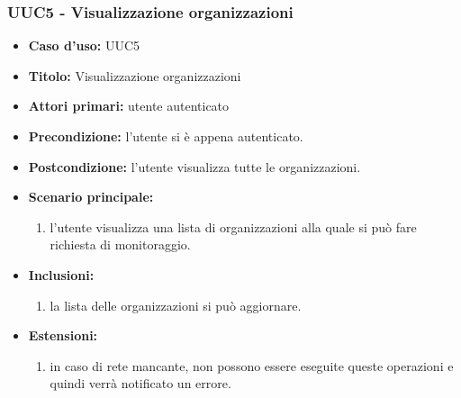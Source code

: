 \documentclass[casi-duso]{subfiles}
\begin{document}
\subsubsection{UUC5 - Visualizzazione organizzazioni}
\label{subsub:UUC5utente}
\begin{itemize}
  \item \textbf{Caso d’uso:} UUC5 
  \item \textbf{Titolo:} Visualizzazione organizzazioni
  \item \textbf{Attori primari:} utente autenticato
  \item \textbf{Precondizione:} l'utente si è appena autenticato.
  \item \textbf{Postcondizione:} l'utente visualizza tutte le organizzazioni.
  \item \textbf{Scenario principale:} 
  \begin{enumerate}
    \item l'utente visualizza una lista di organizzazioni alla quale si può fare richiesta di monitoraggio.
  \end{enumerate}  
  \item \textbf{Inclusioni:} 
  \begin{enumerate}
    \item la lista delle organizzazioni si può aggiornare.
  \end{enumerate}
  \item \textbf{Estensioni:} 
  \begin{enumerate}
    \item in caso di rete mancante, non possono essere eseguite queste operazioni e quindi verrà notificato un errore.
  \end{enumerate}  
\end{itemize}

\end{document}
